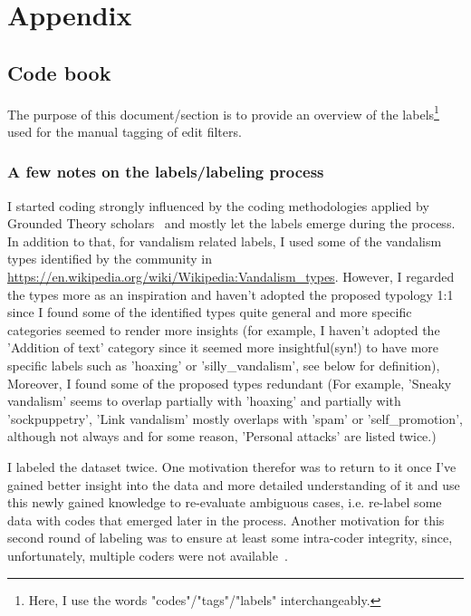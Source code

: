 %

\chapter{Appendix}
\label{ch:Appendix}

\section{Code book}
\label{app:code_book}

The purpose of this document/section is to provide an overview of the labels\footnote{Here, I use the words "codes"/"tags"/"labels" interchangeably.} used for the manual tagging of edit filters.

\subsection{A few notes on the labels/labeling process}

I started coding strongly influenced by the coding methodologies applied by Grounded Theory scholars~\cite[42-71]{Charmaz2006} and mostly let the labels emerge during the process. %
In addition to that, for vandalism related labels, I used some of the vandalism types identified by the community in \url{https://en.wikipedia.org/wiki/Wikipedia:Vandalism_types}.
However, I regarded the types more as an inspiration and haven't adopted the proposed typology 1:1 since I found some of the identified types quite general and more specific categories seemed to render more insights
(for example, I haven't adopted the 'Addition of text' category since it seemed more insightful(syn!) to have more specific labels such as 'hoaxing' or 'silly\_vandalism', see below for definition),
Moreover, I found some of the proposed types redundant
(For example, 'Sneaky vandalism' seems to overlap partially with 'hoaxing' and partially with 'sockpuppetry', 'Link vandalism' mostly overlaps with 'spam' or 'self\_promotion', although not always and for some reason, 'Personal attacks' are listed twice.)

I labeled the dataset twice.
One motivation therefor was to return to it once I've gained better insight into the data and more detailed understanding of it and use this newly gained knowledge to re-evaluate ambiguous cases, i.e. re-label some data with codes that emerged later in the process.
Another motivation for this second round of labeling was to ensure at least some intra-coder integrity, since, unfortunately, multiple coders were not available~\cite{LazFenHo2017}. %

